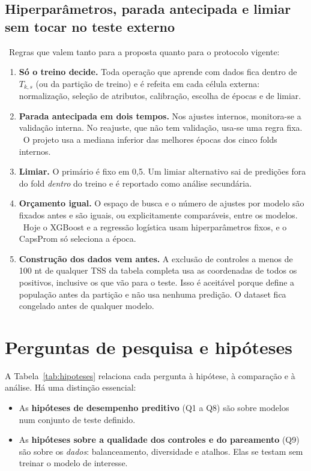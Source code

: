 \documentclass[11pt,a4paper]{article}
\newcommand{\etiqueta}[2]{\tcbox[on line, colback=#1!10, colframe=#1!75!black,
  boxrule=0.4pt, arc=1.2pt, left=1.5pt, right=1.5pt, top=0pt, bottom=0pt,
  fontupper=\sffamily\scriptsize\bfseries]{#2}}
\newcommand{\proj}{\etiqueta{oiGreen}{Projeto}}
\newcommand{\rec}{\etiqueta{oiVerm}{Recomendação}}
\begin{document}
\subsection{Hiperparâmetros, parada antecipada e limiar sem tocar no teste externo}

\rec\ Regras que valem tanto para a proposta quanto para o protocolo vigente:
\begin{enumerate}[leftmargin=1.4em]
\item \textbf{Só o treino decide.} Toda operação que aprende com dados fica dentro de $T_{k,s}$ (ou da partição de treino) e é refeita em cada célula externa: normalização, seleção de atributos, calibração, escolha de épocas e de limiar.
\item \textbf{Parada antecipada em dois tempos.} Nos ajustes internos, monitora-se a validação interna. No reajuste, que não tem validação, usa-se uma regra fixa. \proj\ O projeto usa a mediana inferior das melhores épocas dos cinco folds internos.
\item \textbf{Limiar.} O primário é fixo em 0,5. Um limiar alternativo sai de predições fora do fold \emph{dentro} do treino e é reportado como análise secundária.
\item \textbf{Orçamento igual.} O espaço de busca e o número de ajustes por modelo são fixados antes e são iguais, ou explicitamente comparáveis, entre os modelos. \proj\ Hoje o XGBoost e a regressão logística usam hiperparâmetros fixos, e o CapsProm só seleciona a época.
\item \textbf{Construção dos dados vem antes.} A exclusão de controles a menos de 100 nt de qualquer TSS da tabela completa usa as coordenadas de todos os positivos, inclusive os que vão para o teste. Isso é aceitável porque define a população antes da partição e não usa nenhuma predição. O dataset fica congelado antes de qualquer modelo.
\end{enumerate}

\section{Perguntas de pesquisa e hipóteses}
\label{sec:hipoteses}

A Tabela~\ref{tab:hipoteses} relaciona cada pergunta à hipótese, à comparação e à análise. Há uma distinção essencial:
\begin{itemize}[leftmargin=1.4em]
\item As \textbf{hipóteses de desempenho preditivo} (Q1 a Q8) são sobre modelos num conjunto de teste definido.
\item As \textbf{hipóteses sobre a qualidade dos controles e do pareamento} (Q9) são sobre os \emph{dados}: balanceamento, diversidade e atalhos. Elas se testam sem treinar o modelo de interesse.
\end{itemize}
\end{document}
